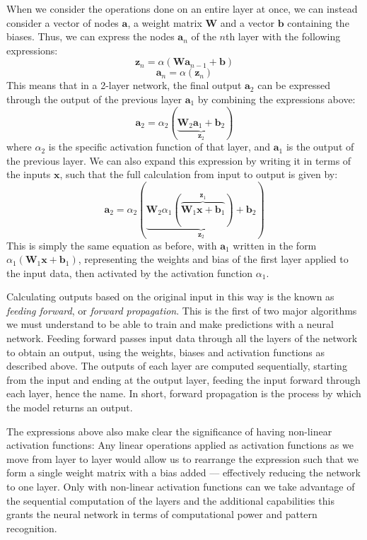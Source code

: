 When we consider the operations done on an entire layer at once, we can instead consider a vector of nodes $\boldsymbol{a}$, a weight matrix $\mathbf{W}$ and a vector $\boldsymbol b$ containing the biases. Thus, we can express the nodes $\boldsymbol a_n$ of the $n$th layer with the following expressions:
\[\boldsymbol z_n = \alpha(\mathbf W \boldsymbol a_{n-1} + \boldsymbol b)\]
\[\boldsymbol a_n = \alpha(\boldsymbol z_n)\]
This means that in a 2-layer network, the final output $\boldsymbol a_2$ can be expressed through the output of the previous layer $\boldsymbol{a}_1$ by combining the expressions above:
\[\boldsymbol{a}_2 = \alpha_2(\underbrace{\mathbf W_2 \boldsymbol a_1  + \boldsymbol b_2}_{\boldsymbol z_2})\]
where $\alpha_2$ is the specific activation function of that layer, and $\boldsymbol a_1$ is the output of the previous layer. We can also expand this expression by writing it in terms of the inputs $\boldsymbol{x}$, such that the full calculation from input to output is given by:
\[\boldsymbol{a}_2 = \alpha_2(\underbrace{\mathbf W_2 \alpha_1(\overbrace{\mathbf W_1 \boldsymbol{x} + \boldsymbol b_1}^{\boldsymbol z_1})  + \boldsymbol b_2}_{\boldsymbol z_2})\]
This is simply the same equation as before, with $\boldsymbol a_1$ written in the form $\alpha_1(\mathbf W_1 \boldsymbol{x} + \boldsymbol b_1)$, representing the weights and bias of the first layer applied to the input data, then activated by the activation function $\alpha_1$.

Calculating outputs based on the original input in this way is the known as \emph{feeding forward}, or \emph{forward propagation}. This is the first of two major algorithms we must understand to be able to train and make predictions with a neural network. Feeding forward passes input data through all the layers of the network to obtain an output, using the weights, biases and activation functions as described above. The outputs of each layer are computed sequentially, starting from the input and ending at the output layer, feeding the input forward through each layer, hence the name. In short, forward propagation is the process by which the model returns an output.

The expressions above also make clear the significance of having non-linear activation functions: Any linear operations applied as activation functions as we move from layer to layer would allow us to rearrange the expression such that we form a single weight matrix with a bias added –– effectively reducing the network to one layer. Only with non-linear activation functions can we take advantage of the sequential computation of the layers and the additional capabilities this grants the neural network in terms of computational power and pattern recognition.

